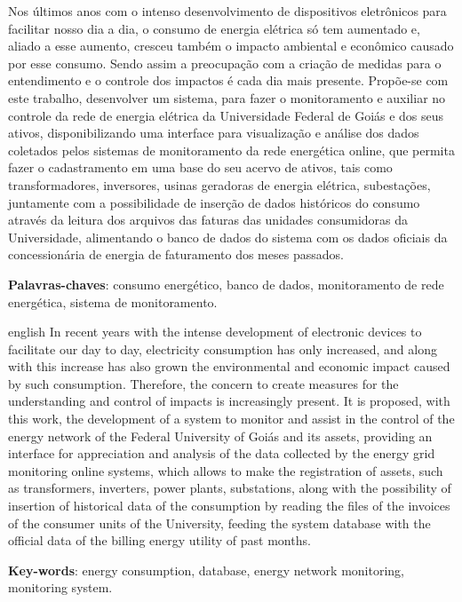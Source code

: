 \setlength{\absparsep}{18pt} %
\begin{resumo}
 Nos últimos anos com o intenso desenvolvimento de dispositivos eletrônicos para facilitar nosso dia a dia, o consumo de energia elétrica só tem aumentado e, aliado a esse aumento, cresceu também o impacto ambiental e econômico causado por esse consumo. Sendo assim a preocupação com a criação de medidas para o entendimento e o controle dos impactos é cada dia mais presente. Propõe-se com este trabalho, desenvolver um sistema, para fazer o monitoramento e auxiliar no controle da rede de energia elétrica da Universidade Federal de Goiás e dos seus ativos, disponibilizando uma interface para visualização e análise dos dados coletados pelos sistemas de monitoramento da rede energética online, que permita fazer o cadastramento em uma base do seu acervo de ativos, tais como transformadores, inversores, usinas geradoras de energia elétrica, subestações, juntamente com a possibilidade de inserção de dados históricos do consumo através da leitura dos arquivos das faturas das unidades consumidoras da Universidade, alimentando o banco de dados do sistema com os dados oficiais da concessionária de energia de faturamento dos meses passados. 

 \textbf{Palavras-chaves}: consumo energético, banco de dados, monitoramento de rede energética, sistema de monitoramento.
\end{resumo}

\begin{resumo}[Abstract]
 \begin{otherlanguage*}{english}
   In recent years with the intense development of electronic devices to facilitate our day to day, electricity consumption has only increased, and along with this increase has also grown the environmental and economic impact caused by such consumption. Therefore, the concern to create measures for the understanding and control of impacts is increasingly present. It is proposed, with this work, the development of a system to monitor and assist in the control of the energy network of the Federal University of Goiás and its assets, providing an interface for appreciation and analysis of the data collected by the energy grid monitoring online systems, which allows to make the registration of assets, such as transformers, inverters, power plants, substations, along with the possibility of insertion of historical data of the consumption by reading the files of the invoices of the consumer units of the University, feeding the system database with the official data of the billing energy utility of past months.

   \vspace{\onelineskip}
 
   \noindent 
   \textbf{Key-words}: energy consumption, database, energy network monitoring, monitoring system.
 \end{otherlanguage*}
\end{resumo}